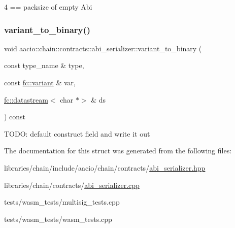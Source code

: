 4 == packsize of empty Abi \mbox{\label{structaacio_1_1chain_1_1contracts_1_1abi__serializer_ac10d0962d2f4e062905e47d7b0946e5a}} 
\subsubsection{\texorpdfstring{variant\+\_\+to\+\_\+binary()}{variant\_to\_binary()}}
{\footnotesize\ttfamily void aacio\+::chain\+::contracts\+::abi\+\_\+serializer\+::variant\+\_\+to\+\_\+binary (\begin{DoxyParamCaption}\item[{const type\+\_\+name \&}]{type,  }\item[{const \mbox{\hyperlink{classfc_1_1variant}{fc\+::variant}} \&}]{var,  }\item[{\mbox{\hyperlink{classfc_1_1datastream}{fc\+::datastream}}$<$ char $\ast$$>$ \&}]{ds }\end{DoxyParamCaption}) const}

T\+O\+DO\+: default construct field and write it out 

The documentation for this struct was generated from the following files\+:\begin{DoxyCompactItemize}
\item 
libraries/chain/include/aacio/chain/contracts/\mbox{\hyperlink{abi__serializer_8hpp}{abi\+\_\+serializer.\+hpp}}\item 
libraries/chain/contracts/\mbox{\hyperlink{abi__serializer_8cpp}{abi\+\_\+serializer.\+cpp}}\item 
tests/wasm\+\_\+tests/multisig\+\_\+tests.\+cpp\item 
tests/wasm\+\_\+tests/wasm\+\_\+tests.\+cpp\end{DoxyCompactItemize}
